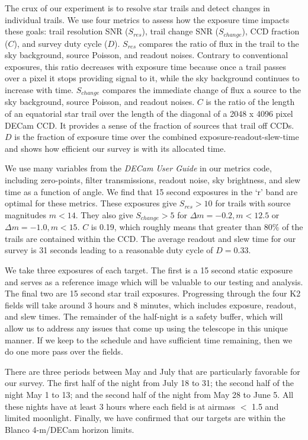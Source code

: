 \documentclass[11pt]{article}
\begin{document}
\technicaldescription

The crux of our experiment is to resolve star trails and detect changes in individual trails. We use four metrics to assess how the exposure time impacts these goals: trail resolution SNR ($S_{res}$), trail change SNR ($S_{change}$), CCD fraction ($C$), and survey duty cycle ($D$). $S_{res}$ compares the ratio of flux in the trail to the sky background, source Poisson, and readout noises. Contrary to conventional exposures, this ratio decreases with exposure time because once a trail passes over a pixel it stops providing signal to it, while the sky background continues to increase with time. $S_{change}$ compares the immediate change of flux a source to the sky background, source Poisson, and readout noises. $C$ is the ratio of the length of an equatorial star trail over the length of the diagonal of a 2048 x 4096 pixel DECam CCD. It provides a sense of the fraction of sources that trail off CCDs. $D$ is the fraction of exposure time over the combined exposure-readout-slew-time and shows how efficient our survey is with its allocated time.

We use many variables from the \textit{DECam User Guide} in our metrics code, including zero-points, filter transmissions, readout noise, sky brightness, and slew time as a function of angle. We find that 15 second exposures in the `r' band are optimal for these metrics. These exposures give $S_{res} > 10$ for trails with source magnitudes $m < 14$. They also give $S_{change} > 5$ for $\Delta m = -0.2, m < 12.5$ or $\Delta m = -1.0, m < 15$. $C$ is 0.19, which roughly means that greater than 80\% of the trails are contained within the CCD. The average readout and slew time for our survey is 31 seconds leading to a reasonable duty cycle of $D = 0.33$.

We take three exposures of each target. The first is a 15 second static exposure and serves as a reference image which will be valuable to our testing and analysis. The final two are 15 second star trail exposures. Progressing through the four K2 fields will take around 3 hours and 8 minutes, which includes exposure, readout, and slew times. The remainder of the half-night is a safety buffer, which will allow us to address any issues that come up using the telescope in this unique manner. If we keep to the schedule and have sufficient time remaining, then we do one more pass over the fields.

There are three periods between May and July that are particularly favorable for our survey. The first half of the night from July 18 to 31; the second half of the night May 1 to 13; and the second half of the night from May 28 to June 5. All these nights have at least 3 hours where each field is at airmass $<$ 1.5 and limited moonlight. Finally, we have confirmed that our targets are within the Blanco 4-m/DECam horizon limits.
\end{document}
